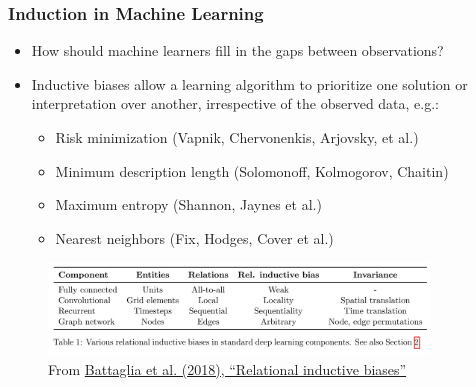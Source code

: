 \documentclass{beamer}
\begin{document}
  \begin{frame}
    \frametitle{Induction in Machine Learning}
    \begin{itemize}
      \item How should machine learners fill in the gaps between observations?
      \item Inductive biases allow a learning algorithm to prioritize one solution or interpretation over another, irrespective of the observed data, e.g.:
      \begin{itemize}
        \item Risk minimization (Vapnik, Chervonenkis, Arjovsky, et al.)
        \item Minimum description length (Solomonoff, Kolmogorov, Chaitin)
        \item Maximum entropy (Shannon, Jaynes et al.)
        \item Nearest neighbors (Fix, Hodges, Cover et al.)
        \end{itemize}
    \end{itemize}
    \begin{figure}[H]
      \centering
      \includegraphics[width=0.9\textwidth]{../clipart/relational_inductive_biases.jpg}
      \caption{From \href{https://arxiv.org/pdf/1806.01261.pdf}{Battaglia et al. (2018), ``Relational inductive biases''}}
    \end{figure}
  \end{frame}
\end{document}
